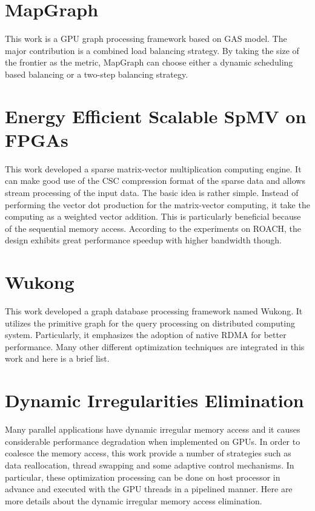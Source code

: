 \section{MapGraph}
This work \cite{fu2014mapgraph} is a GPU graph processing framework based on GAS model.
The major contribution is a combined load balancing strategy. By taking the size of
the frontier as the metric, MapGraph can choose either a dynamic scheduling
based balancing or a two-step balancing strategy.

\section{Energy Efficient Scalable SpMV on FPGAs}
This work \cite{dorrance2014scalable} developed a sparse matrix-vector multiplication computing engine. It
can make good use of the CSC compression format of the sparse data and allows
stream processing of the input data. The basic idea is rather simple. Instead of
performing the vector dot production for the matrix-vector computing, it take
the computing as a weighted vector addition. This is particularly beneficial
because of the sequential memory access. According to the experiments on ROACH,
the design exhibits great performance speedup with higher bandwidth though.

\section{Wukong}
This work developed a graph database processing framework named Wukong.
It utilizes the primitive graph for the query processing on distributed
computing system. Particularly, it emphasizes the adoption of native RDMA for
better performance. Many other different optimization
techniques are integrated in this work and here is a brief list.

\section{Dynamic Irregularities Elimination}
Many parallel applications have dynamic irregular memory access and it causes
considerable performance degradation when implemented on GPUs. In order to
coalesce the memory access, this work \cite{Zhang2011elimination} provide a number of strategies such as
data reallocation, thread swapping and some adaptive control mechanisms. In
particular, these optimization processing can be done on host processor in
advance and executed with the GPU threads in a pipelined manner. Here are more
details about the dynamic irregular memory access elimination. 

